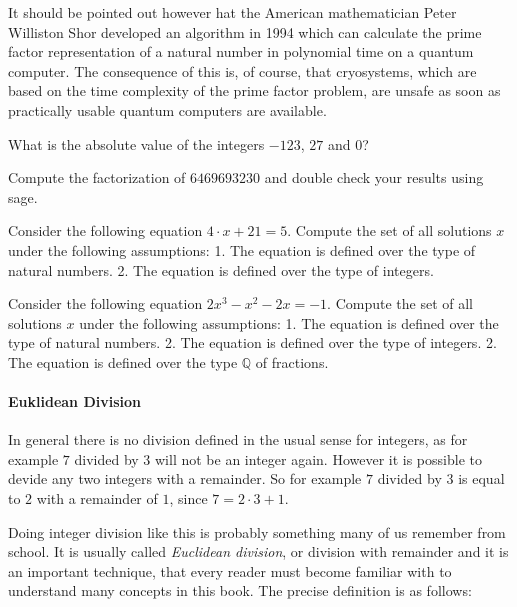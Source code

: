 It should be pointed out however hat the American mathematician Peter Williston Shor developed an algorithm in 1994 which can calculate the prime factor representation of a natural number in polynomial time on a quantum computer. The consequence of this is, of course, that cryosystems, which are based on the time complexity of the prime factor problem, are unsafe as soon as practically usable quantum computers are available.
\begin{exercise}
What is the absolute value of the integers $-123$, $27$ and $0$?
\end{exercise}
\begin{exercise}
Compute the factorization of $6469693230$ and double check your results using sage.
\end{exercise}
\begin{exercise}
Consider the following equation $4\cdot x + 21 = 5$. Compute the set of all solutions $x$ under the following assumptions: 1. The equation is defined over the type of natural numbers. 2. The equation is defined over the type of integers.
\end{exercise}
\begin{exercise}
Consider the following equation $2 x^3 - x^2 - 2 x = - 1$. Compute the set of all solutions $x$ under the following assumptions: 1. The equation is defined over the type of natural numbers. 2. The equation is defined over the type of integers. 2. The equation is defined over the type $\mathbb{Q}$ of fractions.
\end{exercise}

\paragraph{Euklidean Division}
\label{Euklidean_division}
In general there is no division defined in the usual sense for integers, as for example $7$ divided by $3$ will not be an integer again. However it is possible to devide any two integers with a remainder. So for example $7$ divided by $3$ is equal to $2$ with a remainder of $1$, since $7 = 2\cdot 3 + 1$. 

Doing integer division like this is probably something many of us remember from school. It is 
usually called \textit{Euclidean division}, or division with remainder and it is an important technique, that every reader must become familiar with to understand many concepts in this book. The precise definition is as follows:

